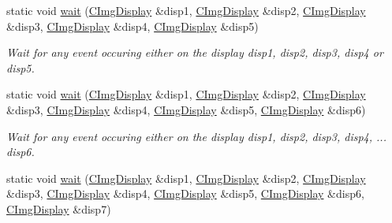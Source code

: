 \begin{DoxyCompactItemize}
\mbox{\label{structcimg__library__suffixed_1_1CImgDisplay_ac548c54e4ec1d3df50ca862a33959b0f}} 
static void \hyperlink{structcimg__library__suffixed_1_1CImgDisplay_ac548c54e4ec1d3df50ca862a33959b0f}{wait} (\hyperlink{structcimg__library__suffixed_1_1CImgDisplay}{C\+Img\+Display} \&disp1, \hyperlink{structcimg__library__suffixed_1_1CImgDisplay}{C\+Img\+Display} \&disp2, \hyperlink{structcimg__library__suffixed_1_1CImgDisplay}{C\+Img\+Display} \&disp3, \hyperlink{structcimg__library__suffixed_1_1CImgDisplay}{C\+Img\+Display} \&disp4, \hyperlink{structcimg__library__suffixed_1_1CImgDisplay}{C\+Img\+Display} \&disp5)
\begin{DoxyCompactList}\small\item\em Wait for any event occuring either on the display {\ttfamily disp1}, {\ttfamily disp2}, {\ttfamily disp3}, {\ttfamily disp4} or {\ttfamily disp5}. \end{DoxyCompactList}\item 
\mbox{\label{structcimg__library__suffixed_1_1CImgDisplay_a25a53b87fdb9ddf72e26712d398ce5a7}} 
static void \hyperlink{structcimg__library__suffixed_1_1CImgDisplay_a25a53b87fdb9ddf72e26712d398ce5a7}{wait} (\hyperlink{structcimg__library__suffixed_1_1CImgDisplay}{C\+Img\+Display} \&disp1, \hyperlink{structcimg__library__suffixed_1_1CImgDisplay}{C\+Img\+Display} \&disp2, \hyperlink{structcimg__library__suffixed_1_1CImgDisplay}{C\+Img\+Display} \&disp3, \hyperlink{structcimg__library__suffixed_1_1CImgDisplay}{C\+Img\+Display} \&disp4, \hyperlink{structcimg__library__suffixed_1_1CImgDisplay}{C\+Img\+Display} \&disp5, \hyperlink{structcimg__library__suffixed_1_1CImgDisplay}{C\+Img\+Display} \&disp6)
\begin{DoxyCompactList}\small\item\em Wait for any event occuring either on the display {\ttfamily disp1}, {\ttfamily disp2}, {\ttfamily disp3}, {\ttfamily disp4}, ... {\ttfamily disp6}. \end{DoxyCompactList}\item 
\mbox{\label{structcimg__library__suffixed_1_1CImgDisplay_a89d3f95fbc89318b9b46851e624b5993}} 
static void \hyperlink{structcimg__library__suffixed_1_1CImgDisplay_a89d3f95fbc89318b9b46851e624b5993}{wait} (\hyperlink{structcimg__library__suffixed_1_1CImgDisplay}{C\+Img\+Display} \&disp1, \hyperlink{structcimg__library__suffixed_1_1CImgDisplay}{C\+Img\+Display} \&disp2, \hyperlink{structcimg__library__suffixed_1_1CImgDisplay}{C\+Img\+Display} \&disp3, \hyperlink{structcimg__library__suffixed_1_1CImgDisplay}{C\+Img\+Display} \&disp4, \hyperlink{structcimg__library__suffixed_1_1CImgDisplay}{C\+Img\+Display} \&disp5, \hyperlink{structcimg__library__suffixed_1_1CImgDisplay}{C\+Img\+Display} \&disp6, \hyperlink{structcimg__library__suffixed_1_1CImgDisplay}{C\+Img\+Display} \&disp7)

\end{DoxyCompactItemize}
